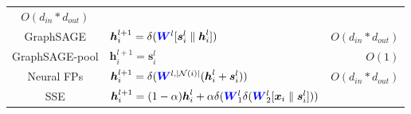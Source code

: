 \begin{table}
\begin{footnotesize}
\begin{tabular}{cp{20em}r}
			$O(d_{in} * d_{out})$                                                                                                                                                                                              \\
			GraphSAGE                                                                                                                                                                                                        &
			$\boldsymbol{h}_i^{l+1} =   \delta(\textcolor{blue}{\boldsymbol{W}}^l  [\boldsymbol{s}_i^{l} \parallel \boldsymbol{h}_i^l])$                                                                                     &
			$O(d_{in} * d_{out})$                                                                                                                                                                                              \\
			GraphSAGE-pool                                                                                                                                                                                                   &
			$\boldsymbol{h}_i^{l+1} = \boldsymbol{s}_i^l$                                                                                                                                                                    &
			$O(1)$                                                                                                                                                                                                             \\
			Neural FPs                                                                                                                                                                                                       &
			$\boldsymbol{h}_i^{l+1} = \delta(\textcolor{blue}{\boldsymbol{W}}^{l, |\mathcal{N}(i)|}  (\boldsymbol{h}_i^l + \boldsymbol{s}_i^{l}))$                                                                           &
			$O(d_{in} * d_{out})$                                                                                                                                                                                              \\
			SSE                                                                                                                                                                                                              &
			$\boldsymbol{h}_i^{l+1} = (1 - \alpha)  \boldsymbol{h}_i^l +\alpha    \delta(\textcolor{blue}{\boldsymbol{W}}^l_1 \delta(\textcolor{blue}{\boldsymbol{W}}^l_2 [\boldsymbol{x}_i \parallel \boldsymbol{s}_i^l]))$ &

\end{tabular}
\end{footnotesize}
\end{table}
